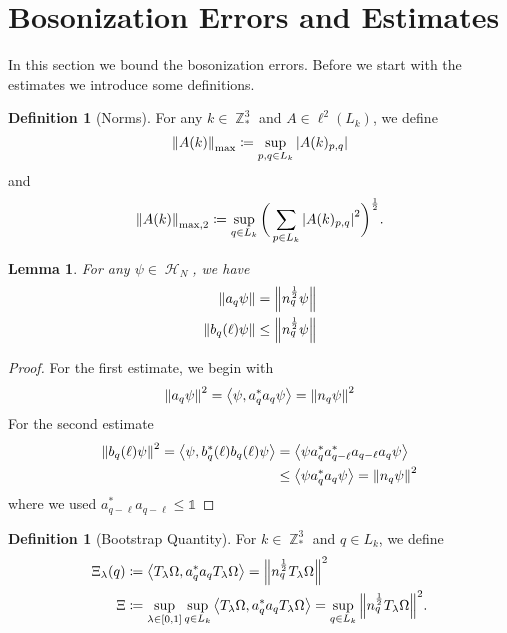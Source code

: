 \documentclass[sn-mathphys, Numbered ,a4paper]{sn-jnl}%
\DeclareMathOperator{\Z}{\mathbb{Z}}
\DeclareMathOperator{\HH}{\mathcal{H}}
\newcommand{\half}{\frac{1}{2}}
\newcommand{\eva}[1]{\left\langle #1 \right\rangle}
\theoremstyle{plain}
\newtheorem{lemma}[theorem]{Lemma}
\theoremstyle{definition}
\newtheorem{definition}[theorem]{Definition}
\theoremstyle{remark}
\theoremstyle{plain}
\theoremstyle{definition}
\theoremstyle{remark}
\begin{document}
\section{Bosonization Errors and Estimates}
In this section we bound the bosonization errors. Before we start with the estimates we introduce some definitions.

\begin{definition}[Norms]
    For any $k \in \Z^3_*$ and $A\in \ell^2(L_k)$, we define
      \begin{equation}
          \norm{A(k)}_{\mathrm{max}} \coloneq \sup\limits_{p,q \in L_k}\abs{A(k)_{p,q}}
      \end{equation}
      and
      \begin{equation}
          \norm{A(k)}_{\mathrm{max},2} \coloneq \sup\limits_{q \in L_k}\bigg(\sum\limits_{p \in L_k}\abs{A(k)_{p,q}}^2\bigg)^\half.
      \end{equation}
\end{definition}
\begin{lemma}
	For any $\psi \in \HH_N$, we have 
	\begin{align}
		\norm{a_q\psi}&= \norm{n_q^\half\psi} \\
		\norm{b_q(\ell)\psi}&\leq \norm{n_q^\half\psi}
	\end{align}
\end{lemma}
\begin{proof}
	For the first estimate, we begin with
	\begin{equation}
		\norm{a_q\psi}^2=\eva{\psi,a^*_q a_q\psi}=\norm{n_q\psi}^2
	\end{equation}
For the second estimate
	\begin{align}
		\norm{b_q(\ell)\psi}^2=\eva{\psi,b^*_q(\ell) b_q(\ell)\psi} &=\eva{\psi a^*_q a^*_{q-\ell} a_{q-\ell} a_q\psi}\nonumber\\
		&\leq \eva{\psi a^*_q a_q\psi} = \norm{n_q\psi}^2
	\end{align}
where we used $a^*_{q-\ell}a_{q-\ell}\leq \mathds{1}$ 
\end{proof}
\begin{definition}[Bootstrap Quantity]
 For $k \in \Z^3_*$ and $q\in L_k$, we define 
    \begin{align}
        \Xi_{\lambda}(q) &\coloneq \expval{T_\lambda\Omega, a^*_qa_qT_\lambda\Omega} = \norm{n_q^\half T_{\lambda}\Omega}^2\\
        \Xi &\coloneq \sup\limits_{\lambda \in[0,1]}\sup\limits_{q \in L_k}\expval{T_\lambda\Omega, a^*_qa_qT_\lambda\Omega} = \sup\limits_{q \in L_k}\norm{n_q^\half T_{\lambda}\Omega}^2.
    \end{align}
\end{definition}
\end{document}

